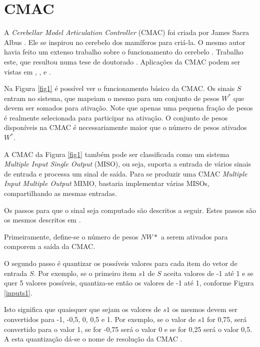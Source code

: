 
\goodbreak
\newpage
\clearpage

\section[CMAC]{CMAC}
\label{cmac_sec}

A \emph{Cerebellar Model Articulation Controller} (CMAC) foi criada por James Sacra Albus \cite{Albus1975b}. 
Ele se inspirou no cerebelo dos mamíferos para criá-la. 
O mesmo autor havia feito um extenso trabalho sobre o funcionamento do cerebelo \cite{Albus1971b}.
Trabalho este, que resultou numa tese de doutorado \cite{Albus1972a}.
Aplicações da CMAC podem ser vistas em \cite{Albus1975d}, \cite{Albus1979}, \cite{Sabourin2006a} e \cite{Lin2002a}.

Na Figura \ref{fig1} é possível ver o funcionamento básico da CMAC. Os sinais $S$ entram no sistema, que mapeiam o mesmo para um conjunto de pesos $W^*$ que devem ser somados para ativação. 
Note que apenas uma pequena fração de pesos é realmente selecionada para participar na ativação. 
O conjunto de pesos disponíveis na CMAC é necessariamente maior que o número de pesos ativados $W^*$. 

A CMAC da Figura \ref{fig1} também pode ser classificada como um sistema \emph{Multiple Input Single Output} (MISO), ou seja, suporta a entrada de vários sinais de entrada e processa um sinal de saída.
Para se produzir uma CMAC \emph{Multiple Input Multiple Output} MIMO, bastaria implementar várias MISOs, compartilhando as mesmas entradas.


Os passos para que o sinal seja computado são descritos a seguir. Estes passos são os mesmos descritos em .

Primeiramente, define-se o número de pesos $NW*$ a serem ativados para comporem a saída da CMAC.

O segundo passo é quantizar os possíveis valores para cada item do vetor de entrada $S$.
Por exemplo, se o primeiro item $s1$ de $S$ aceita valores de -1 até 1 e se quer 5 valores possíveis, quantiza-se então os valores de -1 até 1, conforme Figura \ref{inputs1}.



Isto significa que quaisquer que sejam os valores de $s1$ os mesmos devem ser convertidos para -1, -0,5, 0, 0,5 e 1. 
Por exemplo, se o valor de $s1$ for 0,75, será convertido para o valor 1, se for -0,75 será o valor 0 e se for 0,25 será o valor 0,5. A esta quantização dá-se o nome de resolução da CMAC \cite{Albus1975b}.

